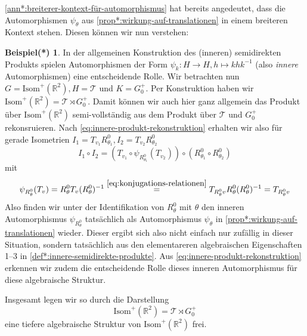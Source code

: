 \documentclass[a4paper, ngerman]{article}
\newcounter{chapter}
\numberwithin{equation}{chapter}
\theoremstyle{plain}
\theoremstyle{definition}
\newtheorem{examplestrd}{Beispiel(*)}[chapter]
\newcommand{\geradisometr}{\ensuremath{\mathrm{Isom}^+(\mathbb R^2)}}
\newcommand{\anm}[1]{{\color{red} #1}}
\begin{document}
\cref{ann*:breiterer-kontext-für-automorphismus} hat bereits angedeutet, dass die Automorphismen \(\psi_\theta\) aus \cref{prop*:wirkung-auf-translationen} in einem breiteren Kontext stehen. Diesen können wir nun verstehen:
\begin{examplestrd}
    In der allgemeinen Konstruktion des (inneren) semidirekten Produkts spielen Automorphismen der Form \(\psi_k: H \to H, h\mapsto khk^{-1}\) (also \textit{innere} Automorphismen) eine entscheidende Rolle. Wir betrachten nun \(G = \geradisometr, H = \mathcal T\) und \(K = G_0^+\). %
    Per Konstruktion haben wir \(\mathrm{Isom}^+(\mathbb R^2) = \mathcal T \rtimes G_0^+\). 
    Damit können wir auch hier ganz allgemein das Produkt über \(\geradisometr\) semi-vollständig aus dem Produkt über \(\mathcal T\) und \(G_0^+\) rekonsruieren. Nach \eqref{eq:innere-produkt-rekonstruktion} erhalten wir also für gerade Isometrien \(I_1 = T_{v_1}R_{\theta_1}^0, I_2 = T_{v_2}R_{\theta_2}^0\)
    \begin{equation*}
        I_1\circ I_2 = (T_{v_1}\circ \psi_{R_{\theta_1}^0}(T_{v_2}))\circ (R_{\theta_1}^0 \circ R_{\theta_2}^0)
    \end{equation*}
    mit
    \begin{equation*}
        \psi_{R_\theta^0}(T_v) = R_\theta^0 T_v (R_\theta^0)^{-1} \stackrel{\eqref{eq:konjugations-relationen}}{=} T_{R_\theta^0 v} R_\theta^0 (R_\theta^0)^{-1} = T_{R_\theta^0 v}
    \end{equation*}
    Also finden wir unter der Identifikation von \(R_\theta^0\) mit \(\theta\) den inneren Automorphismus \(\psi_{R_\theta^0}\) tatsächlich als Automorphismus \(\psi_\theta\) in \cref{prop*:wirkung-auf-translationen} wieder. Dieser ergibt sich also nicht einfach nur zufällig in dieser Situation, sondern tatsächlich aus den elementareren algebraischen Eigenschaften 1--3 in \cref{def*:innere-semidirekte-produkte}. Aus \eqref{eq:innere-produkt-rekonstruktion} erkennen wir zudem die entscheidende Rolle dieses inneren Automorphismus für diese algebraische Struktur. 

    Insgesamt legen wir so durch die Darstellung 
    \begin{equation*}
        \geradisometr = \mathcal T \rtimes G_0^+ 
    \end{equation*}
    eine tiefere algebraische Struktur von \(\geradisometr\) frei. 
\end{examplestrd}
\end{document}
